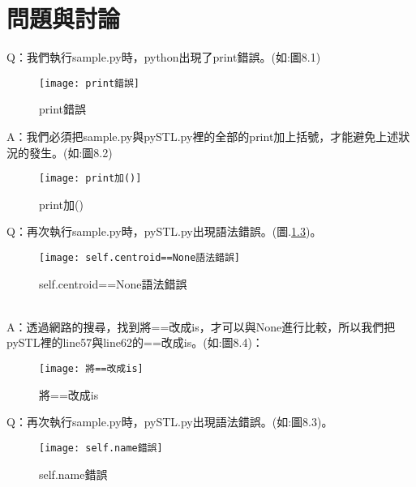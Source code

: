 \chapter{問題與討論}
 Q：我們執行sample.py時，python出現了print錯誤。(如:圖8.1)\\
\begin{figure}[hbt!]
\begin{center}
\texttt{[image: print錯誤]}
\caption{\Large print錯誤}
\label{print錯誤}
\end{center}
\end{figure}

A：我們必須把sample.py與pySTL.py裡的全部的print加上括號，才能避免上述狀況的發生。(如:圖8.2)\\

\begin{figure}[hbt!]
\begin{center}
\texttt{[image: print加()]}
\caption{\Large print加()}
\label{print加()}
\end{center}
\end{figure}

Q：再次執行sample.py時，pySTL.py出現語法錯誤。(圖.\ref{self.centroid==None語法錯誤})。\\
\begin{figure}[hbt!]
\begin{center}
\texttt{[image: self.centroid==None語法錯誤]}
\caption{\Large self.centroid==None語法錯誤}
\label{self.centroid==None語法錯誤}
\end{center}
\end{figure}
\qquad \\
A：透過網路的搜尋，找到將==改成is，才可以與None進行比較，所以我們把pySTL裡的line57與line62的==改成is。(如:圖8.4)：\\

\begin{figure}[hbt!]
\begin{center}
\texttt{[image: 將==改成is]}
\caption{\Large 將==改成is}
\label{將==改成is}
\end{center}
\end{figure}

Q：再次執行sample.py時，pySTL.py出現語法錯誤。(如:圖8.3)。\\
\begin{figure}[hbt!]
\begin{center}
\texttt{[image: self.name錯誤]}
\caption{\Large self.name錯誤}
\label{self.name錯誤}
\end{center}
\end{figure}
\qquad \\


